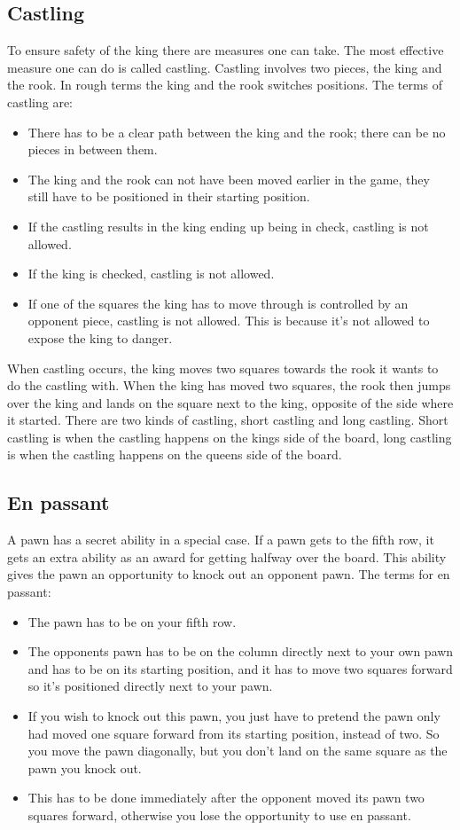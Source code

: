 \documentclass{article}
\begin{document}
\subsection*{Castling} To ensure safety of the king there are measures one can take. The most effective measure one can do is called castling. Castling involves two pieces, the king and the rook. In rough terms the king and the rook switches positions. The terms of castling are:
\begin{itemize}
	\item There has to be a clear path between the king and the rook; there can be no pieces in between them. 
	\item The king and the rook can not have been moved earlier in the game, they still have to be positioned in their starting position. 
	\item If the castling results in the king ending up being in check, castling is not allowed.
	\item If the king is checked, castling is not allowed.
	\item If one of the squares the king has to move through is controlled by an opponent piece, castling is not allowed. This is because it’s not allowed to expose the king to danger.
\end{itemize}
When castling occurs, the king moves two squares towards the rook it wants to do the castling with. When the king has moved two squares, the rook then jumps over the king and lands on the square next to the king, opposite of the side where it started.
There are two kinds of castling, short castling and long castling. Short castling is when the castling happens on the kings side of the board, long castling is when the castling happens on the queens side of the board.

\subsection*{En passant} A pawn has a secret ability in a special case. If a pawn gets to the fifth row, it gets an extra ability as an award for getting halfway over the board. This ability gives the pawn an opportunity to knock out an opponent pawn. The terms for en passant:
\begin{itemize}
	\item The pawn has to be on your fifth row. 
	\item The opponents pawn has to be on the column directly next to your own pawn and has to be on its starting position, and it has to move two squares forward so it’s positioned directly next to your pawn. 
	\item If you wish to knock out this pawn, you just have to pretend the pawn only had moved one square forward from its starting position, instead of two. So you move the pawn diagonally, but you don’t land on the same square as the pawn you knock out. 
	\item This has to be done immediately after the opponent moved its pawn two squares forward, otherwise you lose the opportunity to use en passant.
\end{itemize}
\end{document}
